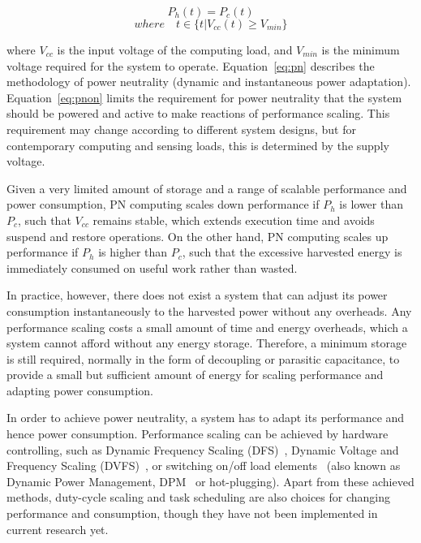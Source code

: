 \begin{equation} \label{eq:pn}
    P_h(t) = P_c(t)
\end{equation}
\begin{equation} \label{eq:pnon}
    where\quad t \in \{t|V_{cc}(t) \geq V_{min}\}
\end{equation}

where $V_{cc}$ is the input voltage of the computing load, and $V_{min}$ is the minimum voltage required for the system to operate. Equation~\ref{eq:pn} describes the methodology of power neutrality (dynamic and instantaneous power adaptation). Equation~\ref{eq:pnon} limits the requirement for power neutrality that the system should be powered and active to make reactions of performance scaling. This requirement may change according to different system designs, but for contemporary computing and sensing loads, this is determined by the supply voltage. 

Given a very limited amount of storage and a range of scalable performance and power consumption, PN computing scales down performance if $P_h$ is lower than $P_c$, such that $V_{cc}$ remains stable, which extends execution time and avoids suspend and restore operations. On the other hand, PN computing scales up performance if $P_h$ is higher than $P_c$, such that the excessive harvested energy is immediately consumed on useful work rather than wasted.

In practice, however, there does not exist a system that can adjust its power consumption instantaneously to the harvested power without any overheads. Any performance scaling costs a small amount of time and energy overheads, which a system cannot afford without any energy storage. Therefore, a minimum storage is still required, normally in the form of decoupling or parasitic capacitance, to provide a small but sufficient amount of energy for scaling performance and adapting power consumption.

In order to achieve power neutrality, a system has to adapt its performance and hence power consumption. Performance scaling can be achieved by hardware controlling, such as Dynamic Frequency Scaling (DFS)~\cite{balsamo2016graceful}, Dynamic Voltage and Frequency Scaling (DVFS)~\cite{fletcher2017power}, or switching on/off load elements~\cite{wang2016storage, fletcher2017power} (also known as Dynamic Power Management, DPM~\cite{lu2000low} or hot-plugging). Apart from these achieved methods, duty-cycle scaling and task scheduling are also choices for changing performance and consumption, though they have not been implemented in current research yet.

